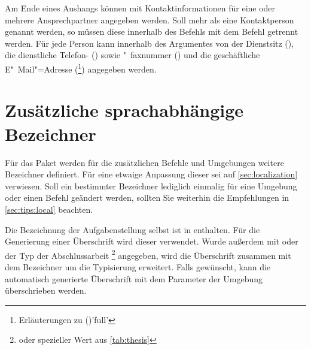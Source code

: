 \begin{DeclareEntity}{}
\begin{Declaration}
\begin{Declaration}
\begin{Declaration}
\begin{Declaration}
Am Ende eines Aushangs können mit  Kontaktinformationen 
für eine oder mehrere Ansprechpartner angegeben werden. Soll mehr als eine 
Kontaktperson genannt werden, so müssen diese innerhalb des Befehls
 mit dem Befehl  getrennt werden. Für jede 
Person kann innerhalb des Argumentes von  der Dienstsitz 
(), die dienstliche Telefon- () sowie "~faxnummer
() und die geschäftliche E"~Mail"=Adresse 
(\footnote{Erläuterungen zu ()'full'}) 
angegeben werden.
\end{Declaration}
\end{Declaration}
\end{Declaration}
\end{Declaration}



\section{%
  Zusätzliche sprachabhängige Bezeichner%
}

Für das Paket  werden für die zusätzlichen Befehle 
und Umgebungen weitere Bezeichner definiert. Für eine etwaige Anpassung dieser 
sei auf \autoref{sec:localization} verwiesen. Soll ein bestimmter Bezeichner 
lediglich einmalig für eine Umgebung oder einen Befehl geändert werden, sollten 
Sie weiterhin die Empfehlungen in \autoref{sec:tips:local} beachten.

\begin{Declaration}
  {}
\begin{Declaration}
  {}
\printdeclarationlist

Die Bezeichnung der Aufgabenstellung selbst ist in  enthalten. 
Für die Generierung einer Überschrift wird dieser verwendet. Wurde außerdem mit 
 oder  der Typ der Abschlussarbeit%
\footnote{%
   oder spezieller Wert aus \autoref{tab:thesis}%
}
angegeben, wird die Überschrift zusammen mit dem Bezeichner 
um die Typisierung erweitert. Falls gewünscht, kann die automatisch generierte 
Überschrift mit dem Parameter  der Umgebung 
 überschrieben werden.
%
\end{Declaration}
\end{Declaration}


\end{DeclareEntity}
